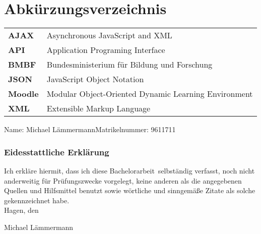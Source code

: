 \documentclass[twoside,bibliography=totoc,openany]{fumi}
\newcommand{\thesisauthor}{Michael Lämmermann}
\newcommand{\thesistype}{Bachelorarbeit} %
\newcommand{\thesismatrikelnummer}{9611711}
\begin{document}
\renewcommand\lstlistlistingname{Verzeichnis der Auflistungen}
\lstlistoflistings
\cleardoublepage


\renewcommand*\listalgorithmcfname{Verzeichnis der Algorithmen}
\listofalgorithms
\cleardoublepage


\chapter*{Abkürzungsverzeichnis}


\renewcommand*{\arraystretch}{1.4}
\setlength{\LTleft}{0pt}
\begin{longtable}[l]{p{2cm}p{15cm}}
\textbf{AJAX} & Asynchronous JavaScript and XML \\
\textbf{API} & Application Programing Interface \\
\textbf{BMBF} & Bundesministerium für Bildung und Forschung \\
\textbf{JSON} & JavaScript Object Notation \\
\textbf{Moodle} & Modular Object-Oriented Dynamic Learning Environment \\
\textbf{XML} & Extensible Markup Language \\
\end{longtable}

\cleardoublepage


Name: \thesisauthor \hfill Matrikelnummer: \thesismatrikelnummer \vspace{2cm}
\subsection*{Eidesstattliche Erklärung}
Ich erkläre hiermit, dass ich diese \thesistype~selbständig verfasst, noch nicht anderweitig für Prüfungszwecke vorgelegt, keine anderen als die angegebenen Quellen und Hilfsmittel benutzt sowie wörtliche und sinngemäße Zitate als solche gekennzeichnet habe.\\[1cm]
Hagen, den \dotfill

\hspace{2cm}{\footnotesize Datum}\hspace{5cm} {\footnotesize \thesisauthor}
\end{document}
